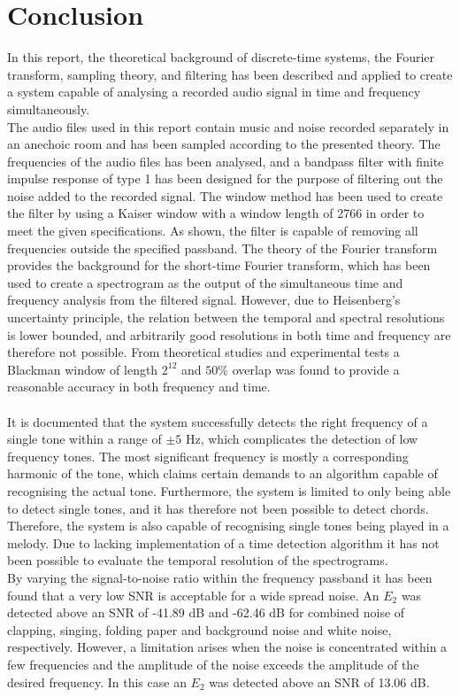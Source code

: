 \chapter{Conclusion}
In this report, the theoretical background of discrete-time systems, the Fourier transform, sampling theory, and filtering has been described and applied to create a system capable of analysing a recorded audio signal in time and frequency simultaneously.
\\
The audio files used in this report contain music and noise recorded separately in an anechoic room and has been sampled according to the presented theory. The frequencies of the audio files has been analysed, and a bandpass filter with finite impulse response of type 1 has been designed for the purpose of filtering out the noise added to the recorded signal. The window method has been used to create the filter by using a Kaiser window with a window length of 2766 in order to meet the given specifications. As shown, the filter is capable of removing all frequencies outside the specified passband. The theory of the Fourier transform provides the background for the short-time Fourier transform, which has been used to create a spectrogram as the output of the simultaneous time and frequency analysis from the filtered signal. However, due to Heisenberg's uncertainty principle, the relation between the temporal and spectral resolutions is lower bounded, and arbitrarily good resolutions in both time and frequency are therefore not possible. From theoretical studies and experimental tests a Blackman window of length $2^{12}$ and $50\%$ overlap was found to provide a reasonable accuracy in both frequency and time.
\\ \\
It is documented that the system successfully detects the right frequency of a single tone within a range of $\pm 5$ Hz, which complicates the detection of low frequency tones. The most significant frequency is mostly a corresponding harmonic of the tone, which claims certain demands to an algorithm capable of recognising the actual tone. Furthermore, the system is limited to only being able to detect single tones, and it has therefore not been possible to detect chords. Therefore, the system is also capable of recognising single tones being played in a melody. Due to lacking implementation of a time detection algorithm it has not been possible to evaluate the temporal resolution of the spectrograms.
\\
By varying the signal-to-noise ratio within the frequency  passband it has been found that a very low SNR is acceptable for a wide spread noise. An $E_2$ was detected above an SNR of -41.89 dB and -62.46 dB for combined noise of clapping, singing, folding paper and background noise and white noise, respectively. However, a limitation arises when the noise is concentrated within a few frequencies and the amplitude of the noise exceeds the amplitude of the desired frequency. In this case an $E_2$ was detected above an SNR of 13.06 dB.
